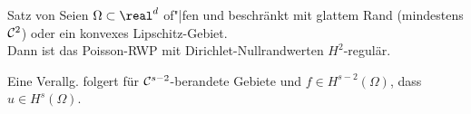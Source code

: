 \linie

\begin{Satz}{Satz von }
    Seien $\Omega \subset \real^d$ of"|fen und beschränkt mit glattem Rand
    (mindestens $\mathcal{C}^2$) oder ein konvexes Lipschitz-Gebiet.\\
    Dann ist das Poisson-RWP mit Dirichlet-Nullrandwerten $H^2$-regulär.
\end{Satz}

\begin{Bem}
    Eine Verallg. folgert für $\mathcal{C}^{s-2}$-berandete Gebiete und
    $f \in H^{s-2}(\Omega)$, dass $u \in H^s(\Omega)$.
\end{Bem}

\pagebreak
